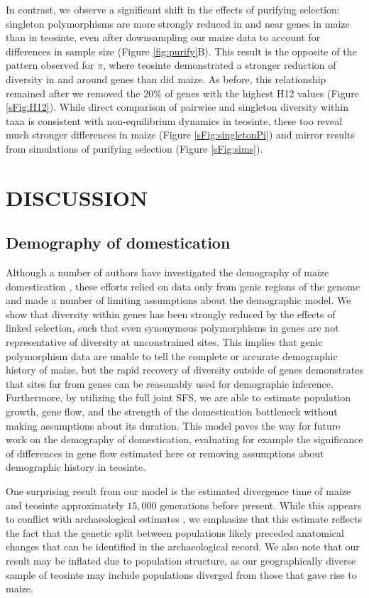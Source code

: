 \documentclass[12pt,a4paper]{article}
\begin{document}
In contrast, we observe a significant shift in the effects of purifying selection: singleton polymorphisms are more strongly reduced in and near genes in maize than in teosinte, even after downsampling our maize data to account for differences in sample size (Figure \ref{fig:purify}B). 
This result is the opposite of the pattern observed for $\pi$, where teosinte demonstrated a stronger reduction of diversity in and around genes than did maize. 
As before, this relationship remained after we removed the 20\% of genes with the highest H12 values (Figure \ref{sFig:H12}).
While direct comparison of pairwise and singleton diversity within taxa is consistent with non-equilibrium dynamics in teosinte, these too reveal much stronger differences in maize (Figure \ref{sFig:singletonPi}) and mirror results from simulations of purifying selection (Figure \ref{sFig:sims}).


\section*{DISCUSSION}


\subsection*{Demography of domestication} %
Although a number of authors have investigated the demography of maize domestication \cite{eyre1998, tenaillon2004, wright2005}, these  efforts relied on data only from genic regions of the genome and made a number of limiting assumptions about the demographic model.  We show that diversity within genes has been strongly reduced by the effects of linked selection, such that even synonymous polymorphisms in genes are not representative of diversity at unconstrained sites. This implies that genic polymorphism data are unable to tell the complete or accurate demographic history of maize, but the rapid recovery of diversity outside of genes demonstrates that sites far from genes can be reasonably used for demographic inference. Furthermore, by utilizing the full joint SFS, we are able to estimate population growth, gene flow, and the strength of the domestication bottleneck without making assumptions about its duration.  
This model paves the way for future work on the demography of domestication, evaluating for example the significance of differences in gene flow estimated here or removing assumptions about demographic history in teosinte.

One surprising result from our model is the estimated divergence time of maize and teosinte approximately $15,000$ generations before present.
While this appears to conflict with archaeological estimates \cite{piperno2009}, we emphasize that this estimate reflects the fact that the genetic split between populations likely preceded anatomical changes that can be identified in the archaeological record. 
We also note that our result may be inflated due to population structure, as our geographically diverse sample of teosinte may include populations diverged from those that gave rise to maize.
\end{document}
